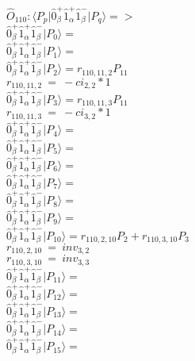 \documentclass[14pt]{article}
\begin{document}
    $\hat{O}_{110}:  \langle{P_p}\vert \hat{0}_{\beta}^{+}\hat{1}_{\alpha}^{+}\hat{1}_{\beta}^{-} \vert{P_q}\rangle => $ \\ 
    $ \hat{0}_{\beta}^{+}\hat{1}_{\alpha}^{+}\hat{1}_{\beta}^{-} \vert{P_{0}}\rangle =  $ \\ 
    $ \hat{0}_{\beta}^{+}\hat{1}_{\alpha}^{+}\hat{1}_{\beta}^{-} \vert{P_{1}}\rangle =  $ \\ 
    $ \hat{0}_{\beta}^{+}\hat{1}_{\alpha}^{+}\hat{1}_{\beta}^{-} \vert{P_{2}}\rangle = {r}_{110,11,2}P_{11} $ \\ 
    ${r}_{110,11,2}\ =\ -{ci}_{2,2}*1 $ \\ 
    $ \hat{0}_{\beta}^{+}\hat{1}_{\alpha}^{+}\hat{1}_{\beta}^{-} \vert{P_{3}}\rangle = {r}_{110,11,3}P_{11} $ \\ 
    ${r}_{110,11,3}\ =\ -{ci}_{3,2}*1 $ \\ 
    $ \hat{0}_{\beta}^{+}\hat{1}_{\alpha}^{+}\hat{1}_{\beta}^{-} \vert{P_{4}}\rangle =  $ \\ 
    $ \hat{0}_{\beta}^{+}\hat{1}_{\alpha}^{+}\hat{1}_{\beta}^{-} \vert{P_{5}}\rangle =  $ \\ 
    $ \hat{0}_{\beta}^{+}\hat{1}_{\alpha}^{+}\hat{1}_{\beta}^{-} \vert{P_{6}}\rangle =  $ \\ 
    $ \hat{0}_{\beta}^{+}\hat{1}_{\alpha}^{+}\hat{1}_{\beta}^{-} \vert{P_{7}}\rangle =  $ \\ 
    $ \hat{0}_{\beta}^{+}\hat{1}_{\alpha}^{+}\hat{1}_{\beta}^{-} \vert{P_{8}}\rangle =  $ \\ 
    $ \hat{0}_{\beta}^{+}\hat{1}_{\alpha}^{+}\hat{1}_{\beta}^{-} \vert{P_{9}}\rangle =  $ \\ 
    $ \hat{0}_{\beta}^{+}\hat{1}_{\alpha}^{+}\hat{1}_{\beta}^{-} \vert{P_{10}}\rangle = {r}_{110,2,10}P_{2}+{r}_{110,3,10}P_{3} $ \\ 
    ${r}_{110,2,10}\ =\ {inv}_{3,2} $ \\ 
    ${r}_{110,3,10}\ =\ {inv}_{3,3} $ \\ 
    $ \hat{0}_{\beta}^{+}\hat{1}_{\alpha}^{+}\hat{1}_{\beta}^{-} \vert{P_{11}}\rangle =  $ \\ 
    $ \hat{0}_{\beta}^{+}\hat{1}_{\alpha}^{+}\hat{1}_{\beta}^{-} \vert{P_{12}}\rangle =  $ \\ 
    $ \hat{0}_{\beta}^{+}\hat{1}_{\alpha}^{+}\hat{1}_{\beta}^{-} \vert{P_{13}}\rangle =  $ \\ 
    $ \hat{0}_{\beta}^{+}\hat{1}_{\alpha}^{+}\hat{1}_{\beta}^{-} \vert{P_{14}}\rangle =  $ \\ 
    $ \hat{0}_{\beta}^{+}\hat{1}_{\alpha}^{+}\hat{1}_{\beta}^{-} \vert{P_{15}}\rangle =  $ \\ 
    
\end{document}
